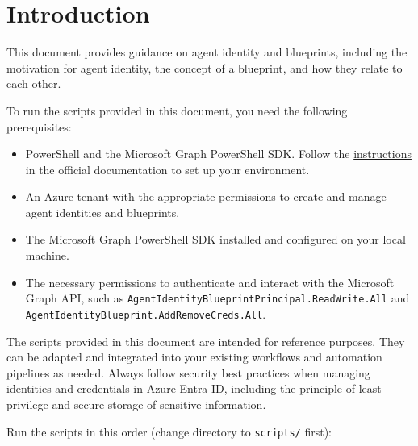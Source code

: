 \documentclass[9pt]{extarticle}%
\begin{document}
\section{Introduction}%
This document provides guidance on agent identity and blueprints, including the motivation for agent identity, the concept of a blueprint, and how they relate to each other.
%
\par\vspace{\baselineskip}%
To run the scripts provided in this document, you need the following prerequisites:
%
\par\vspace{\baselineskip}%
\begin{itemize}[topsep=0pt]%
\item PowerShell and the Microsoft Graph PowerShell SDK. Follow the \href{https://learn.microsoft.com/en-us/powershell/microsoftgraph/installation?view=graph-powershell-1.0}{instructions} in the official documentation to set up your environment.%
\item An Azure tenant with the appropriate permissions to create and manage agent identities and blueprints.%
\item The Microsoft Graph PowerShell SDK installed and configured on your local machine.%
\item The necessary permissions to authenticate and interact with the Microsoft Graph API, such as \texttt{AgentIdentityBlueprintPrincipal.ReadWrite.All} and \texttt{AgentIdentityBlueprint.AddRemoveCreds.All}.%
\end{itemize}%
\vspace{\baselineskip}%
The scripts provided in this document are intended for reference purposes. They can be adapted and integrated into your existing workflows and automation pipelines as needed. Always follow security best practices when managing identities and credentials in Azure Entra ID, including the principle of least privilege and secure storage of sensitive information.
%
\par\vspace{\baselineskip}%
Run the scripts in this order (change directory to \texttt{scripts/} first):
%
\par\vspace{\baselineskip}%
\end{document}
